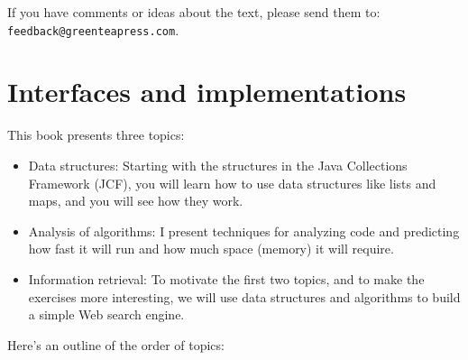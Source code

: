 \documentclass[12pt]{book}
\theoremstyle{exercise}
\begin{document}

If you have comments or ideas about the text, please send
them to: {\tt feedback@greenteapress.com}.


\mainmatter

\chapter{Interfaces and implementations}
\label{cs-lists-programming-to-an-interface-readme}

This book presents three topics:

\begin{itemize}

\item Data structures: Starting with the structures in the Java
Collections Framework (JCF), you will learn how to use data structures
like lists and maps, and you will see how they work.

\item Analysis of algorithms: I present techniques for analyzing
code and predicting how fast it will run and how much space (memory) it
will require.

\item Information retrieval: To motivate the first two topics, and to
make the exercises more interesting, we will use data structures and
algorithms to build a simple Web search engine.

\end{itemize}

Here's an outline of the order of topics:
\end{document}
